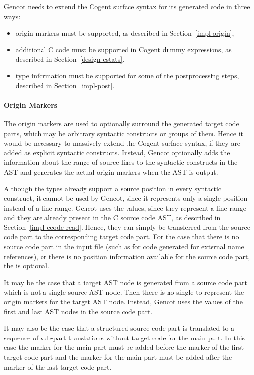 Gencot needs to extend the Cogent surface syntax for its generated code in three ways:
\begin{itemize}
\item origin markers must be supported, as described in Section~\ref{impl-origin},
\item additional C code must be supported in Cogent dummy expressions, as described in Section~\ref{design-cstats}.
\item type information must be supported for some of the postprocessing steps, described in Section~\ref{impl-post}.
\end{itemize}

\paragraph{Origin Markers}

The origin markers are used to optionally surround the generated target code parts, which may be arbitrary syntactic constructs
or groups of them. Hence it would be necessary to massively extend the Cogent surface syntax, if they are added as explicit 
syntactic constructs. Instead, Gencot optionally adds the information about the range of source lines to the syntactic
constructs in the AST and generates the actual origin markers when the AST is output. 

Although the  types already support a source position in every syntactic construct, it cannot be used by Gencot,
since it represents only a single position instead of a line range. Gencot uses the  values, since they represent
a line range and they are already present in the C source code AST, as described in Section~\ref{impl-ccode-read}. Hence, they
can simply be transferred from the source code part to the corresponding target code part. For the case that there is no
source code part in the input file (such as for code generated for external name references), or there is no position 
information available for the source code part, the  is optional.

It may be the case that a target AST node is generated from a source code part which is not a single source AST node. Then
there is no single  to represent the origin markers for the target AST node. Instead, Gencot uses the 
 values of the first and last AST nodes in the source code part.

It may also be the case that a structured source code part is translated to a sequence of sub-part translations without target
code for the main part. In this case the  marker for the main part must be added before the  
marker of the first target code part and the  marker for the main part must be added after the  
marker of the last target code part. 

